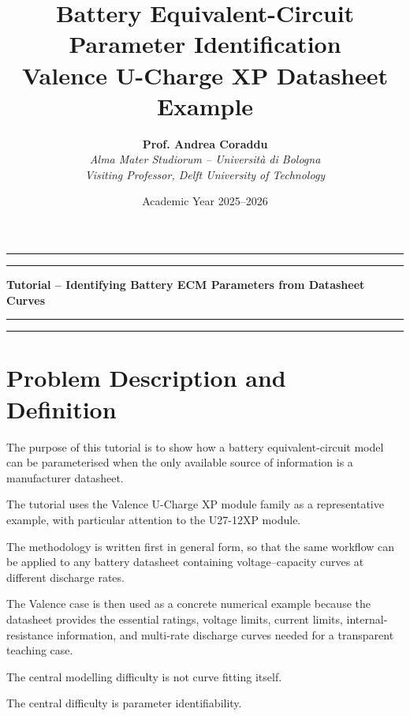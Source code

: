 \documentclass[a4paper,12pt]{article}
\title{%
  Battery Equivalent-Circuit Parameter Identification\\[0.4em]
  \large Valence U-Charge XP Datasheet Example%
}
\author{%
  \textbf{Prof. Andrea Coraddu}\\[0.8em]
  \textit{Alma Mater Studiorum -- Universit\`a di Bologna}\\[0.4em]
  \textit{Visiting Professor, Delft University of Technology}%
}
\date{Academic Year 2025--2026}
\renewcommand{\maketitle}{%
  \begin{center}
    \vspace*{1cm}%
    \rule{\linewidth}{0.5pt}\par\vspace{3em}%
    {\Huge\bfseries\color{TUblue}\thetitle\par}%
    \vspace{2em}%
    \textcolor{TUblue}{\rule{0.35\linewidth}{0.6pt}}\par\vspace{2em}%
    {\large\bfseries\color{TUblue}Tutorial -- Identifying Battery ECM Parameters from Datasheet Curves\par}%
    \vspace{2em}%
    \textcolor{TUblue}{\rule{0.35\linewidth}{0.6pt}}\par\vspace{3em}%
    {\large\theauthor\par}%
    \vspace{1.5em}%
    {\normalsize\thedate\par}%
    \vspace{4em}%
  \end{center}%
}
\begin{document}
\maketitle
\thispagestyle{empty}
\hrule
\vspace{1em}
\newpage

\tableofcontents
\newpage


\newpage \clearpage
\section{Problem Description and Definition}
\label{sec:problem_description_definition}

The purpose of this tutorial is to show how a battery equivalent-circuit model can be parameterised when the only available source of information is a manufacturer datasheet.

The tutorial uses the Valence U-Charge XP module family as a representative example, with particular attention to the U27-12XP module.

The methodology is written first in general form, so that the same workflow can be applied to any battery datasheet containing voltage--capacity curves at different discharge rates.

The Valence case is then used as a concrete numerical example because the datasheet provides the essential ratings, voltage limits, current limits, internal-resistance information, and multi-rate discharge curves needed for a transparent teaching case.

The central modelling difficulty is not curve fitting itself.

The central difficulty is parameter identifiability.

\begin{center}
\end{center}
\end{document}
